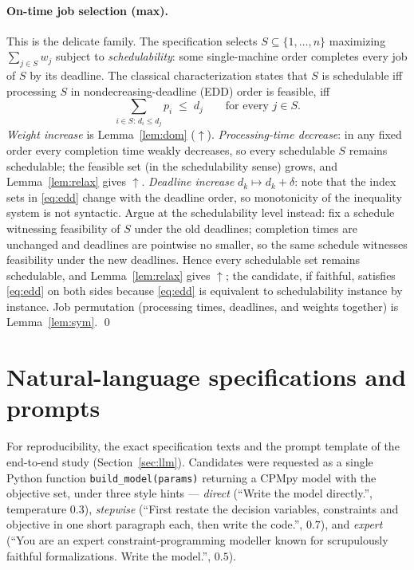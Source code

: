 \documentclass[pdflatex,sn-mathphys-num]{sn-jnl}
\theoremstyle{thmstyleone}
\theoremstyle{thmstyletwo}
\begin{document}
\begin{appendices}
\paragraph{On-time job selection (max).}
This is the delicate family. The specification selects
$S \subseteq \{1, \dots, n\}$ maximizing $\sum_{j \in S} w_j$ subject
to \emph{schedulability}: some single-machine order completes every
job of $S$ by its deadline. The classical characterization states
that $S$ is schedulable iff processing $S$ in nondecreasing-deadline
(EDD) order is feasible, iff
\begin{equation}\label{eq:edd}
\textstyle\sum_{i \in S:\, d_i \le d_j} p_i \;\le\; d_j
\qquad \text{for every } j \in S .
\end{equation}
\emph{Weight increase} is Lemma~\ref{lem:dom} ($\uparrow$).
\emph{Processing-time decrease}: in any fixed order every completion
time weakly decreases, so every schedulable $S$ remains schedulable;
the feasible set (in the schedulability sense) grows, and
Lemma~\ref{lem:relax} gives $\uparrow$. \emph{Deadline increase}
$d_k \mapsto d_k + \delta$: note that the index sets in
\eqref{eq:edd} change with the deadline order, so monotonicity of the
inequality system is not syntactic. Argue at the schedulability
level instead: fix a schedule witnessing feasibility of $S$ under the
old deadlines; completion times are unchanged and deadlines are
pointwise no smaller, so the same schedule witnesses feasibility
under the new deadlines. Hence every schedulable set remains
schedulable, and Lemma~\ref{lem:relax} gives $\uparrow$; the
candidate, if faithful, satisfies \eqref{eq:edd} on both sides
because \eqref{eq:edd} is equivalent to schedulability instance by
instance. Job permutation (processing times, deadlines, and weights
together) is Lemma~\ref{lem:sym}. \qed

\section{Natural-language specifications and prompts}
\label{app:prompts}

For reproducibility, the exact specification texts and the prompt
template of the end-to-end study (Section~\ref{sec:llm}). Candidates
were requested as a single Python function
\texttt{build\_model(params)} returning a CPMpy model with the
objective set, under three style hints --- \emph{direct} (``Write the
model directly.'', temperature $0.3$), \emph{stepwise} (``First
restate the decision variables, constraints and objective in one
short paragraph each, then write the code.'', $0.7$), and
\emph{expert} (``You are an expert constraint-programming modeller
known for scrupulously faithful formalizations. Write the model.'',
$0.5$).


\end{appendices}
\end{document}
